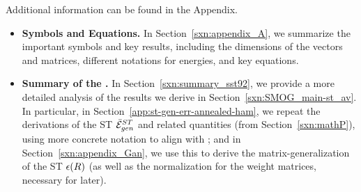 \noindent
Additional information can be found in the Appendix.
\begin{itemize} %
\item
  \textbf{Symbols and Equations.}
  In Section~\ref{sxn:appendix_A}, we summarize the important symbols and key results,
         including the dimensions of the vectors and matrices, different notations for energies,
         and key equations.
   \item
   \textbf{Summary of the \SMOG.}
         In Section~\ref{sxn:summary_sst92}, we provide a more detailed analysis of the results we derive in Section~\ref{sxn:SMOG_main-st_av}.
         In particular, in Section~\ref{app:st-gen-err-annealed-ham}, we repeat the derivations of the ST \GeneralizationError $\bar{\mathcal{E}}^{ST}_{gen}$ and related quantities (from Section~\ref{sxn:mathP}),
         using more concrete notation to align with \cite{SST90, SST92}; and
         in Section~\ref{sxn:appendix_Gan}, we use this to derive the matrix-generalization of the ST \EffectivePotential $\epsilon(R)$ (as well as the normalization for the weight matrices, necessary for later).
\end{itemize} %




%
%
%
%
